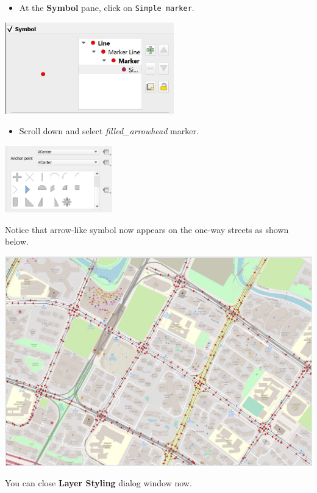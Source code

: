 \documentclass[
  letterpaper,
  DIV=11,
  numbers=noendperiod]{scrreprt}
\providecommand{\tightlist}{%
  \setlength{\itemsep}{0pt}\setlength{\parskip}{0pt}}\usepackage{longtable,booktabs,array}
\begin{document}
\begin{itemize}
\tightlist
\item
  At the \textbf{Symbol} pane, click on \texttt{Simple\ marker}.
\end{itemize}

\includegraphics[width=0.55\textwidth,height=\textheight]{./img09/image19.jpg}

\begin{itemize}
\tightlist
\item
  Scroll down and select \emph{filled\_arrowhead} marker.
\end{itemize}

\includegraphics[width=0.35\textwidth,height=\textheight]{./img09/image20.jpg}

Notice that arrow-like symbol now appears on the one-way streets as
shown below.

\includegraphics{./img09/image21.jpg}

You can close \textbf{Layer Styling} dialog window now.
\end{document}
